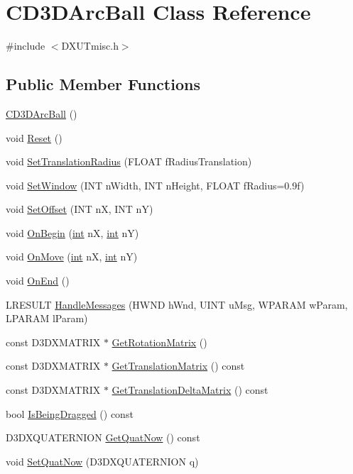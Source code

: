 \hypertarget{class_c_d3_d_arc_ball}{
\section{CD3DArcBall Class Reference}
\label{class_c_d3_d_arc_ball}
}


{\ttfamily \#include $<$DXUTmisc.h$>$}\subsection*{Public Member Functions}
\begin{DoxyCompactItemize}
\item 
\hyperlink{class_c_d3_d_arc_ball_ae5b332fb9c87ddde4670c782b8299e40}{CD3DArcBall} ()
\item 
void \hyperlink{class_c_d3_d_arc_ball_a8e25a9fee7bdad867cf8feb623a3dd1f}{Reset} ()
\item 
void \hyperlink{class_c_d3_d_arc_ball_a72c32f8aa6d34f89765ea75139f65b87}{SetTranslationRadius} (FLOAT fRadiusTranslation)
\item 
void \hyperlink{class_c_d3_d_arc_ball_aac7e91ff2fb6770b18b62b7eaecba6c4}{SetWindow} (INT nWidth, INT nHeight, FLOAT fRadius=0.9f)
\item 
void \hyperlink{class_c_d3_d_arc_ball_a781313e96e3a63e69facead4ca70cf79}{SetOffset} (INT nX, INT nY)
\item 
void \hyperlink{class_c_d3_d_arc_ball_a86882ddd7ee5330641a57b24fd8006f3}{OnBegin} (\hyperlink{_d_x_u_tgui_8cpp_a2d77ed03302b6978834ee3b6f57837fb}{int} nX, \hyperlink{_d_x_u_tgui_8cpp_a2d77ed03302b6978834ee3b6f57837fb}{int} nY)
\item 
void \hyperlink{class_c_d3_d_arc_ball_aab40fc2905516034b37ba0d14b6a6a76}{OnMove} (\hyperlink{_d_x_u_tgui_8cpp_a2d77ed03302b6978834ee3b6f57837fb}{int} nX, \hyperlink{_d_x_u_tgui_8cpp_a2d77ed03302b6978834ee3b6f57837fb}{int} nY)
\item 
void \hyperlink{class_c_d3_d_arc_ball_abf187ce0c2926384d28166ee30df6c24}{OnEnd} ()
\item 
LRESULT \hyperlink{class_c_d3_d_arc_ball_ac2f906cc45310c55c03b6403c22817ca}{HandleMessages} (HWND hWnd, UINT uMsg, WPARAM wParam, LPARAM lParam)
\item 
const D3DXMATRIX $\ast$ \hyperlink{class_c_d3_d_arc_ball_a546036e679d57ea3258a4f77ba8b9df8}{GetRotationMatrix} ()
\item 
const D3DXMATRIX $\ast$ \hyperlink{class_c_d3_d_arc_ball_ad100e8818466d636d428e49fbe634f5b}{GetTranslationMatrix} () const 
\item 
const D3DXMATRIX $\ast$ \hyperlink{class_c_d3_d_arc_ball_a4b402efbd90ff4f6fc916eadfcf61482}{GetTranslationDeltaMatrix} () const 
\item 
bool \hyperlink{class_c_d3_d_arc_ball_ac7ca13b553ce0ecce4d375697d0866e3}{IsBeingDragged} () const 
\item 
D3DXQUATERNION \hyperlink{class_c_d3_d_arc_ball_ad256f4f111901c148228b745a274d828}{GetQuatNow} () const 
\item 
void \hyperlink{class_c_d3_d_arc_ball_ad3140af4e1b4f62a18238ac2991de9a6}{SetQuatNow} (D3DXQUATERNION q)
\end{DoxyCompactItemize}
